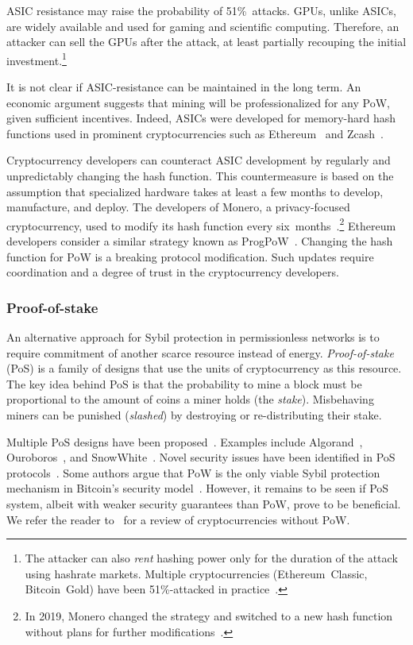 ASIC resistance may raise the probability of 51\%~attacks.
GPUs, unlike ASICs, are widely available and used for gaming and scientific computing.
Therefore, an attacker can sell the GPUs after the attack, at least partially recouping the initial investment.\footnote{The attacker can also \textit{rent} hashing power only for the duration of the attack using hashrate markets. Multiple cryptocurrencies (Ethereum~Classic, Bitcoin~Gold) have been 51\%-attacked in practice~\cite{Xazax3102019}.}

It is not clear if ASIC-resistance can be maintained in the long term.
An economic argument suggests that mining will be professionalized for any PoW, given sufficient incentives.
Indeed, ASICs were developed for memory-hard hash functions used in prominent cryptocurrencies such as Ethereum~\cite{OLeary2018} and Zcash~\cite{Floyd2018}.

Cryptocurrency developers can counteract ASIC development by regularly and unpredictably changing the hash function.
This countermeasure is based on the assumption that specialized hardware takes at least a few months to develop, manufacture, and deploy.
The developers of Monero, a privacy-focused cryptocurrency, used to modify its hash function every six~months~\cite{Kim2019}.\footnote{In 2019, Monero changed the strategy and switched to a new hash function without plans for further modifications~\cite{dEBRUYNE2019}.}
Ethereum developers consider a similar strategy known as ProgPoW~\cite{OLeary2019}.
Changing the hash function for PoW is a breaking protocol modification.
Such updates require coordination and a degree of trust in the cryptocurrency developers.


\subsubsection*{Proof-of-stake}

An alternative approach for Sybil protection in permissionless networks is to require commitment of another scarce resource instead of energy.
\textit{Proof-of-stake} (PoS) is a family of designs that use the units of cryptocurrency as this resource.
The key idea behind PoS is that the probability to mine a block must be proportional to the amount of coins a miner holds (the \textit{stake}).
Misbehaving miners can be punished (\textit{slashed}) by destroying or re-distributing their stake.


Multiple PoS designs have been proposed~\cite{Bano2019}.
Examples include Algorand~\cite{Chen2019}, Ouroboros~\cite{Kiayias2017}, and SnowWhite~\cite{Bentov2016a}.
Novel security issues have been identified in PoS protocols~\cite{Fanti2019,Gazi2018,BrownCohen2019,Chitra2020}.
Some authors argue that PoW is the only viable Sybil protection mechanism in Bitcoin's security model~\cite{Andreev2014, Sztorc2015, Poelstra2015}.
However, it remains to be seen if PoS system, albeit with weaker security guarantees than PoW, prove to be beneficial.
We refer the reader to~\cite{Bentov2016} for a review of cryptocurrencies without PoW.


